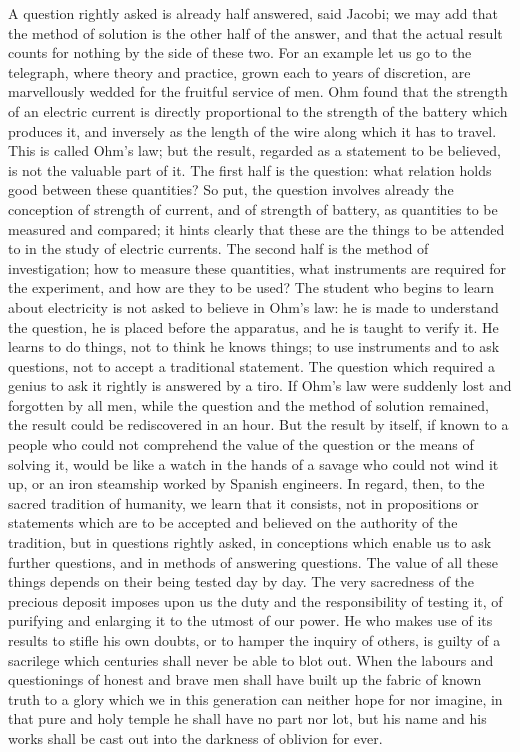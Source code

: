\documentclass[12pt]{article}
\begin{document}
A question rightly asked is already half answered, said Jacobi; we may add that the method of solution is the other half of the answer, and that the actual result counts for nothing by the side of these two. For an example let us go to the telegraph, where theory and practice, grown each to years of discretion, are marvellously wedded for the fruitful service of men. Ohm found that the strength of an electric current is directly proportional to the strength of the battery which produces it, and inversely as the length of the wire along which it has to travel. This is called Ohm's law; but the result, regarded as a statement to be believed, is not the valuable part of it. The first half is the question: what relation holds good between these quantities? So put, the question involves already the conception of strength of current, and of strength of battery, as quantities to be measured and compared; it hints clearly that these are the things to be attended to in the study of electric currents. The second half is the method of investigation; how to measure these quantities, what instruments are required for the experiment, and how are they to be used? The student who begins to learn about electricity is not asked to believe in Ohm's law:  he is made to understand the question, he is placed before the apparatus, and he is taught to verify it. He learns to do things, not to think he knows things; to use instruments and to ask questions, not to accept a traditional statement. The question which required a genius to ask it rightly is answered by a tiro. If Ohm's law were suddenly lost and forgotten by all men, while the question and the method of solution remained, the result could be rediscovered in an hour. But the result by itself, if known to a people who could not comprehend the value of the question or the means of solving it, would be like a watch in the hands of a savage who could not wind it up, or an iron steamship worked by Spanish engineers. In regard, then, to the sacred tradition of humanity, we learn that it consists, not in propositions or statements which are to be accepted and believed on the authority of the tradition, but in questions rightly asked, in conceptions which enable us to ask further questions, and in methods of answering questions. The value of all these things depends on their being tested day by day. The very sacredness of the precious deposit imposes upon us the duty and the responsibility of testing it, of purifying and enlarging it to the utmost of our power. He who makes use of its results to stifle his own doubts, or to hamper the inquiry of others, is guilty of a sacrilege which centuries shall never be able to blot out. When the labours and questionings of honest and brave men shall have built up the fabric of known truth to a glory which we in this generation can neither hope for nor imagine, in that pure and holy temple he shall have no part nor lot, but his name and his works shall be cast out into the darkness of oblivion for ever.
\end{document}
